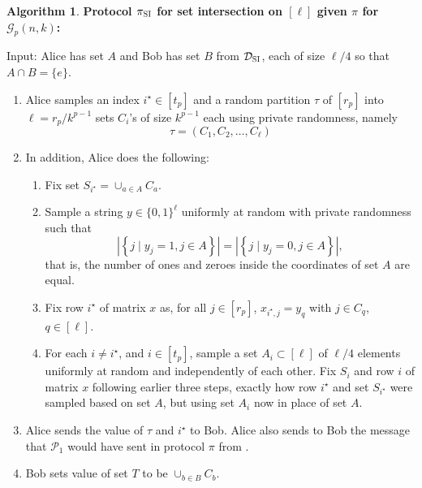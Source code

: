 \documentclass[11pt]{article}
\theoremstyle{definition}
\newenvironment{ourbox}{\begin{mdframed}[hidealllines=false,innerleftmargin=10pt,backgroundcolor=white!10,innertopmargin=5pt,innerbottommargin=5pt,roundcorner=10pt]}{\end{mdframed}}
\newtheorem{mdalgorithm}{Algorithm}
\newenvironment{Algorithm}{\begin{ourbox}\begin{mdalgorithm}}{\end{mdalgorithm}\end{ourbox}}
\newcommand{\card}[1]{\left\vert{#1}\right\vert}
\newcommand{\set}[1]{\ensuremath{\left\{ #1 \right\}}}
\newcommand{\player}[1]{\ensuremath{\mathcal{P}_{#1}}}
\newcommand{\cG}{\ensuremath{\mathcal{G}}}
\newcommand{\istar}{\ensuremath{i^{\star}}}
\newcommand{\prot}{\ensuremath{\pi}}
\newcommand{\cDSI}{\ensuremath{\mathcal{D}_{\textnormal{\textsc{SI}}}}}
\newcommand{\protsetint}{\ensuremath{\prot_{\textnormal{\textsc{SI}}}}}
\begin{document}
	\begin{Algorithm}
		\textbf{Protocol $\protsetint$ for set intersection on $[\ell]$ given $\prot$ for $\cG_p(n,k)$:} 
		
		Input: Alice has set $A$ and Bob has set $B$ from $\cDSI$, each of size $\ell/4$ so that $A \cap B = \{e\}$. 
		\begin{enumerate}[label=$(\roman*)$]
			\item Alice  samples an index $\istar \in [t_p]$ and a random partition $\tau$ of $[r_p]$ into $\ell = r_p/k^{p-1}$ sets $C_i$'s of size $k^{p-1}$ each  using private randomness, namely 
			\[
			\tau = (C_1, C_2, \ldots, C_{\ell})
			\] 
			\item In addition, Alice does the following: 
			\begin{enumerate}
				\item Fix set $S_{\istar} = \cup_{a \in A} C_a$. 
				\item Sample a string $y \in \{0,1\}^{\ell}$ uniformly at random with private randomness such that
				\[
				\card{\set{j \mid y_j = 1, j \in A}} = \card{\set{j \mid y_j = 0, j \in A}},
				\]
				that is, the number of ones and zeroes inside the coordinates of set $A$ are equal. 
				\item Fix row $\istar$ of matrix $x$ as, for all $j \in [r_p]$, $x_{\istar, j} = y_q$ with $j \in C_q$, $q \in [\ell]$. 
				\item For each $i \neq \istar$, and $i \in [t_p]$, sample a set $A_i \subset [\ell]$ of $\ell/4$ elements uniformly at random and independently of each other. Fix $S_i$ and row $i$ of matrix $x$ following earlier three steps, exactly how row $\istar$ and set $S_{\istar}$ were sampled based on set $A$, but using set $A_i$ now in place of set $A$.  
			\end{enumerate}
			\item Alice sends the value of $\tau$ and $\istar$ to Bob. Alice also sends to Bob the message that $\player{1}$ would have sent in protocol $\prot$ from . 
				\item Bob sets value of set $T$ to be $\cup_{b \in B} C_b$. 
		\end{enumerate}
	\end{Algorithm}
\end{document}
